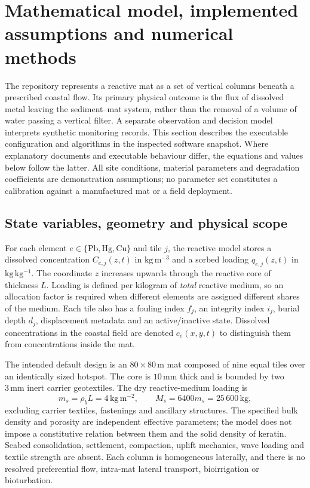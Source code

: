 \section{Mathematical model, implemented assumptions and numerical methods}
\label{sec:methods}

The repository represents a reactive mat as a set of vertical columns beneath a prescribed coastal flow. Its primary physical outcome is the flux of dissolved metal leaving the sediment--mat system, rather than the removal of a volume of water passing a vertical filter. A separate observation and decision model interprets synthetic monitoring records. This section describes the executable configuration and algorithms in the inspected software snapshot. Where explanatory documents and executable behaviour differ, the equations and values below follow the latter. All site conditions, material parameters and degradation coefficients are demonstration assumptions; no parameter set constitutes a calibration against a manufactured mat or a field deployment.\cite{repository}

\subsection{State variables, geometry and physical scope}
\label{sec:state_scope}

For each element $e\in\{\mathrm{Pb},\mathrm{Hg},\mathrm{Cu}\}$ and tile $j$, the reactive model stores a dissolved concentration $C_{e,j}(z,t)$ in $\mathrm{kg\,m^{-3}}$ and a sorbed loading $q_{e,j}(z,t)$ in $\mathrm{kg\,kg^{-1}}$. The coordinate $z$ increases upwards through the reactive core of thickness $L$. Loading is defined per kilogram of \emph{total} reactive medium, so an allocation factor is required when different elements are assigned different shares of the medium. Each tile also has a fouling index $f_j$, an integrity index $i_j$, burial depth $d_j$, displacement metadata and an active/inactive state. Dissolved concentrations in the coastal field are denoted $c_e(x,y,t)$ to distinguish them from concentrations inside the mat.

The intended default design is an $80\times80\,\mathrm{m}$ mat composed of nine equal tiles over an identically sized hotspot. The core is $10\,\mathrm{mm}$ thick and is bounded by two $3\,\mathrm{mm}$ inert carrier geotextiles. The dry reactive-medium loading is
\begin{equation}
 m_s=\rho_b L=4\,\mathrm{kg\,m^{-2}}, \qquad
 M_s=6400m_s=25\,600\,\mathrm{kg},
 \label{eq:media_mass}
\end{equation}
excluding carrier textiles, fastenings and ancillary structures. The specified bulk density and porosity are independent effective parameters; the model does not impose a constitutive relation between them and the solid density of keratin. Seabed consolidation, settlement, compaction, uplift mechanics, wave loading and textile strength are absent. Each column is homogeneous laterally, and there is no resolved preferential flow, intra-mat lateral transport, bioirrigation or bioturbation.

